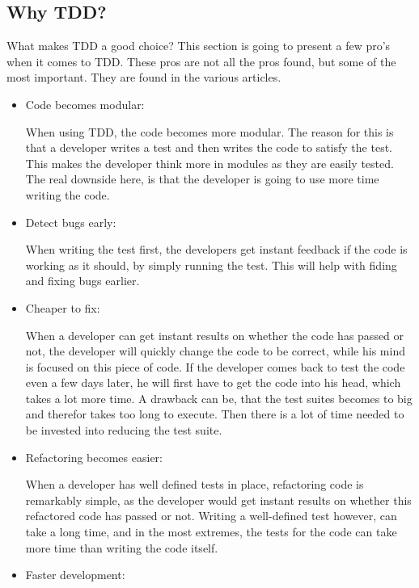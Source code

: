 \subsection{Why TDD?}
What makes TDD a good choice? This section is going to present a few pro’s when it comes to TDD. These pros are not all the pros found, but some of the most important. They are found in the various articles. ~\cite{ad2020} ~\cite{mf2017} ~\cite{sl2018} ~\cite{various2019}


\begin{itemize}
\item Code becomes modular:

When using TDD, the code becomes more modular. The reason for this is that a developer writes a test and then writes the code to satisfy the test.  This makes the developer think more in modules as they are easily tested. The real downside here, is that the developer is going to use more time writing the code.

\item Detect bugs early:

When writing the test first, the developers get instant feedback if the code is working as it should, by simply running the test. This will help with fiding and fixing bugs earlier.  

\item Cheaper to fix:

When a developer can get instant results on whether the code has passed or not, the developer will quickly change the code to be correct, while his mind is focused on this piece of code. If the developer comes back to test the code even a few days later, he will first have to get the code into his head, which takes a lot more time.
A drawback can be, that the test suites becomes to big and therefor takes too long to execute. Then there is a lot of time needed to be invested into reducing the test suite.

\item Refactoring becomes easier:

When a developer has well defined tests in place, refactoring code is remarkably simple, as the developer would get instant results on whether this refactored code has passed or not. Writing a well-defined test however, can take a long time, and in the most extremes, the tests for the code can take more time than writing the code itself.

\item Faster development:


\end{itemize}
